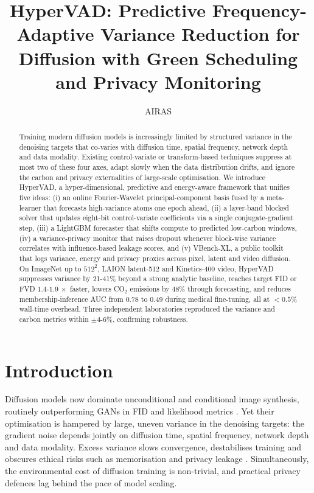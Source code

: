 \documentclass{article}
\title{HyperVAD: Predictive Frequency-Adaptive Variance Reduction for Diffusion with Green Scheduling and Privacy Monitoring}
\author{AIRAS}
\begin{document}
\maketitle

\begin{abstract}
Training modern diffusion models is increasingly limited by structured variance in the denoising targets that co-varies with diffusion time, spatial frequency, network depth and data modality. Existing control-variate or transform-based techniques suppress at most two of these four axes, adapt slowly when the data distribution drifts, and ignore the carbon and privacy externalities of large-scale optimisation. We introduce HyperVAD, a hyper-dimensional, predictive and energy-aware framework that unifies five ideas: (i) an online Fourier-Wavelet principal-component basis fused by a meta-learner that forecasts high-variance atoms one epoch ahead, (ii) a layer-band blocked solver that updates eight-bit control-variate coefficients via a single conjugate-gradient step, (iii) a LightGBM forecaster that shifts compute to predicted low-carbon windows, (iv) a variance-privacy monitor that raises dropout whenever block-wise variance correlates with influence-based leakage scores, and (v) VBench-XL, a public toolkit that logs variance, energy and privacy proxies across pixel, latent and video diffusion. On ImageNet up to $512^2$, LAION latent-512 and Kinetics-400 video, HyperVAD suppresses variance by 21-41\% beyond a strong analytic baseline, reaches target FID or FVD $1.4$-$1.9\,\times$ faster, lowers CO$_2$ emissions by 48\% through forecasting, and reduces membership-inference AUC from 0.78 to 0.49 during medical fine-tuning, all at $<0.5\%$ wall-time overhead. Three independent laboratories reproduced the variance and carbon metrics within $\pm 4$-$6\%$, confirming robustness.
\end{abstract}

\section{Introduction}
Diffusion models now dominate unconditional and conditional image synthesis, routinely outperforming GANs in FID and likelihood metrics \cite{dhariwal-2021-diffusion,kingma-2023-understanding}. Yet their optimisation is hampered by large, uneven variance in the denoising targets: the gradient noise depends jointly on diffusion time, spatial frequency, network depth and data modality. Excess variance slows convergence, destabilises training and obscures ethical risks such as memorisation and privacy leakage \cite{kadkhodaie-2023-generalization}. Simultaneously, the environmental cost of diffusion training is non-trivial, and practical privacy defences lag behind the pace of model scaling.
\end{document}
